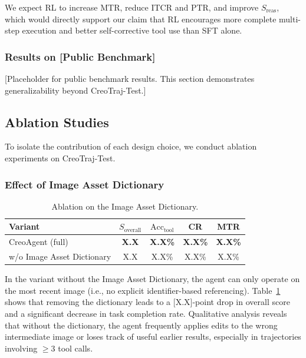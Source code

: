 \documentclass[11pt]{article}
\begin{document}
We expect RL to increase MTR, reduce ITCR and PTR, and improve $S_{\text{reas}}$, which would directly support our claim that RL encourages more complete multi-step execution and better self-corrective tool use than SFT alone.

\subsubsection{Results on [Public Benchmark]}

[Placeholder for public benchmark results. This section demonstrates generalizability beyond CreoTraj-Test.]

\subsection{Ablation Studies}

To isolate the contribution of each design choice, we conduct ablation experiments on CreoTraj-Test.

\subsubsection{Effect of Image Asset Dictionary}

\begin{table}[t]
\centering
\caption{Ablation on the Image Asset Dictionary.}
\label{tab:ablation_dict}
\begin{tabular}{lcccc}
\toprule
\textbf{Variant} & $S_{\text{overall}}$ & $\text{Acc}_{\text{tool}}$ & CR & MTR \\
\midrule
CreoAgent (full) & \textbf{X.X} & \textbf{X.X\%} & \textbf{X.X\%} & \textbf{X.X\%} \\
w/o Image Asset Dictionary & X.X & X.X\% & X.X\% & X.X\% \\
\bottomrule
\end{tabular}
\end{table}



In the variant without the Image Asset Dictionary, the agent can only operate on the most recent image (i.e., no explicit identifier-based referencing). Table~\ref{tab:ablation_dict} shows that removing the dictionary leads to a [X.X]-point drop in overall score and a significant decrease in task completion rate. Qualitative analysis reveals that without the dictionary, the agent frequently applies edits to the wrong intermediate image or loses track of useful earlier results, especially in trajectories involving $\geq$3 tool calls.
\end{document}
